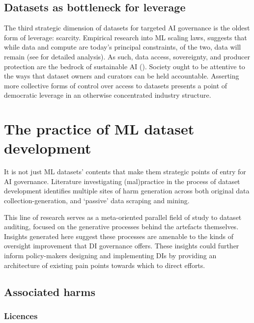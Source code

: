 \subsection*{Datasets as bottleneck for leverage}

The third strategic dimension of datasets for targeted AI governance is the oldest form of leverage: scarcity. Empirical research into ML scaling laws, suggests that while data and compute are today’s principal constraints, of the two, data will remain (see \textcite{kaplan2020ScalingLawsNeural} for detailed analysis). As such, data access, sovereignty, and producer protection are the bedrock of sustainable AI (\cite{curry2022DataSpacesDesign}). Society ought to be attentive to the ways that dataset owners and curators can be held accountable. Asserting more collective forms of control over access to datasets presents a point of democratic leverage in an otherwise concentrated industry structure. 

\section*{The practice of ML dataset development}

It is not just ML datasets' contents that make them strategic points of entry for AI governance. Literature investigating (mal)practice in the process of dataset development identifies multiple sites of harm generation across both original data collection-generation, and ‘passive’ data scraping and mining.

This line of research serves as a meta-oriented parallel field of study to dataset auditing, focused on the generative processes behind the artefacts themselves. Insights generated here suggest these processes are amenable to the kinds of oversight improvement that DI governance offers. These insights could further inform policy-makers designing and implementing DIs by providing an architecture of existing pain points towards which to direct efforts.

\subsection*{Associated harms}

\subsubsection*{Licences}

